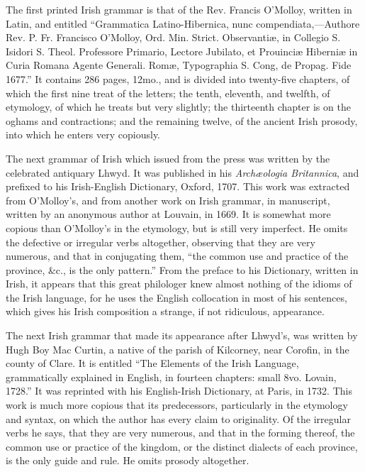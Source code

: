 \documentclass[11pt,oneside]{memoir}
\begin{document}
The first printed Irish grammar is that of the Rev. Francis O'Molloy, written in Latin, and entitled ``Grammatica Latino-Hibernica, nunc compendiata,---Authore Rev. P. Fr. Francisco O'Molloy, Ord. Min. Strict. Observantiæ, in Collegio S. Isidori S. Theol. Professore Primario, Lectore Jubilato, et Prouinciæ Hiberniæ in Curia Romana Agente Generali. Romæ, Typographia S. Cong, de Propag. Fide 1677.''
It contains 286 pages, 12mo., and is divided into twenty-five chapters, of which the first nine treat of the letters; the tenth, eleventh, and twelfth, of etymology, of which he treats but very slightly; the thirteenth chapter is on the oghams and contractions; and the remaining twelve, of the ancient Irish prosody, into which he enters very copiously. 

The next grammar of Irish which issued from the press was written by the celebrated antiquary Lhwyd.
It was published in his \textit{Archæologia Britannica}, and prefixed to his Irish-English Dictionary, Oxford, 1707.
This work was extracted from O'Molloy's, and from another work on Irish grammar, in manuscript, written by an anonymous author at Louvain, in 1669.
It is somewhat more copious than O'Molloy's in the etymology, but is still very imperfect.
He omits the defective or irregular verbs altogether, observing that they are very numerous, and that in conjugating them, ``the common use and practice of the province, \&c., is the only pattern.''
From the preface to his Dictionary, written in Irish, it appears that this great philologer knew almost nothing of the idioms of the Irish language, for he uses the English collocation in most of his sentences, which gives his Irish composition a strange, if not ridiculous, appearance. 

The next Irish grammar that made its appearance after Lhwyd's, was written by Hugh Boy Mac Curtin, a native of the parish of Kilcorney, near Corofin, in the county of Clare.
It is entitled ``The Elements of the Irish Language, grammatically explained in English, in fourteen chapters: small 8vo. Lovain, 1728.''
It was reprinted with his English-Irish Dictionary, at Paris, in 1732.
This work is much more copious that its predecessors, particularly in the etymology and syntax, on which the author has every claim to originality.
Of the irregular verbs he says, that they are very numerous, and that in the forming thereof, the common use or practice of the kingdom, or the distinct dialects of each province, is the only guide and rule.
He omits prosody altogether. 
\end{document}
